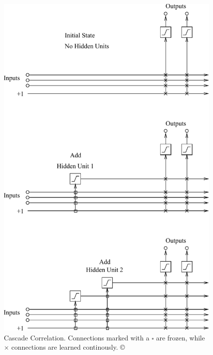 \documentclass[thesis]{subfiles}
\begin{document}
	\begin{figure}[tbp]
		\centering
		\includegraphics{Figs/PDF/fahlmancascade}
		\caption[Cascade Correlation]{Cascade Correlation. Connections marked with a $\square$ are frozen, while $\times$ connections are learned continously. \copyright~\citet{Fahlman1989}}
		\label{fig:cascadecorrelation}
	\end{figure}
	
\end{document}

